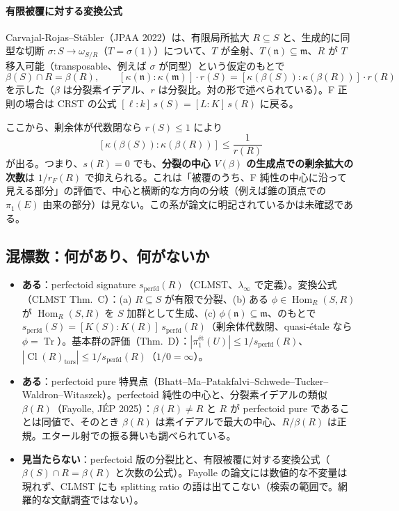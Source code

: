 \documentclass[11pt,a4paper]{ltjsarticle}
\theoremstyle{plain}
\theoremstyle{definition}
\theoremstyle{remark}
\theoremstyle{plain}
\newcommand{\m}{\mathfrak{m}}
\newcommand{\n}{\mathfrak{n}}
\newcommand{\Hom}{\operatorname{Hom}}
\newcommand{\Tr}{\operatorname{Tr}}
\newcommand{\Cl}{\operatorname{Cl}}
\begin{document}
\paragraph{有限被覆に対する変換公式}
Carvajal-Rojas--Stäbler（JPAA 2022）は、有限局所拡大 $R\subseteq S$ と、生成的に同型な切断 $\sigma\colon S\to\omega_{S/R}$（$T = \sigma(1)$）について、$T$ が全射、$T(\n)\subseteq\m$、$R$ が $T$ 移入可能（transposable、例えば $\sigma$ が同型）という仮定のもとで
\[
  \beta(S)\cap R = \beta(R),\qquad
  [\kappa(\n):\kappa(\m)]\cdot r(S) = [\kappa(\beta(S)):\kappa(\beta(R))]\cdot r(R)
\]
を示した（$\beta$ は分裂素イデアル、$r$ は分裂比。対の形で述べられている）。F 正則の場合は CRST の公式 $[\ell:k]\,s(S) = [L:K]\,s(R)$ に戻る。

ここから、剰余体が代数閉なら $r(S)\le1$ により
\[
  [\kappa(\beta(S)):\kappa(\beta(R))]\le\frac{1}{r(R)}
\]
が出る。つまり、$s(R) = 0$ でも、\textbf{分裂の中心 $V(\beta)$ の生成点での剰余拡大の次数}は $1/r_F(R)$ で抑えられる。これは「被覆のうち、F 純性の中心に沿って見える部分」の評価で、中心と横断的な方向の分岐（例えば錐の頂点での $\pi_1(E)$ 由来の部分）は見ない。この系が論文に明記されているかは未確認である。

\subsection{混標数：何があり、何がないか}
\begin{itemize}
  \item \textbf{ある}：perfectoid signature $s_{\mathrm{perfd}}(R)$（CLMST、$\lambda_\infty$ で定義）。変換公式（CLMST Thm.~C）：(a) $R\subseteq S$ が有限で分裂、(b) ある $\phi\in\Hom_R(S,R)$ が $\Hom_R(S,R)$ を $S$ 加群として生成、(c) $\phi(\n)\subseteq\m$、のもとで $s_{\mathrm{perfd}}(S) = [K(S):K(R)]\,s_{\mathrm{perfd}}(R)$（剰余体代数閉、quasi-étale なら $\phi = \Tr$）。基本群の評価（Thm.~D）：$|\pi_1^{\text{ét}}(U)|\le 1/s_{\mathrm{perfd}}(R)$、$|\Cl(R)_{\mathrm{tors}}|\le 1/s_{\mathrm{perfd}}(R)$（$1/0 = \infty$）。
  \item \textbf{ある}：perfectoid pure 特異点（Bhatt--\allowbreak Ma--\allowbreak Patakfalvi--\allowbreak Schwede--\allowbreak Tucker--\allowbreak Waldron--\allowbreak Witaszek）。perfectoid 純性の中心と、分裂素イデアルの類似 $\beta(R)$（Fayolle, JÉP 2025）：$\beta(R)\neq R$ と $R$ が perfectoid pure であることは同値で、そのとき $\beta(R)$ は素イデアルで最大の中心、$R/\beta(R)$ は正規。エタール射での振る舞いも調べられている。
  \item \textbf{見当たらない}：perfectoid 版の分裂比と、有限被覆に対する変換公式（$\beta(S)\cap R = \beta(R)$ と次数の公式）。Fayolle の論文には数値的な不変量は現れず、CLMST にも splitting ratio の語は出てこない（検索の範囲で。網羅的な文献調査ではない）。
\end{itemize}
\end{document}

